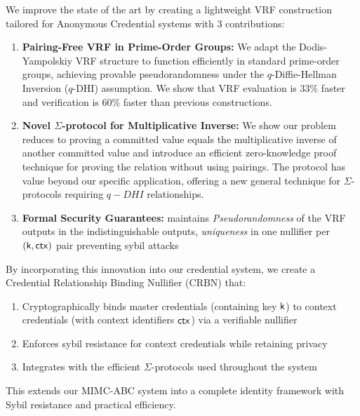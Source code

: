 \noindent We improve the state of the art by creating a lightweight VRF construction tailored for Anonymous Credential systems with 3 contributions:
\begin{enumerate}
        \item \textbf{Pairing-Free VRF in Prime-Order Groups:} We adapt the Dodis-Yampolskiy VRF structure to function efficiently in standard prime-order groups, achieving provable pseudorandomness under the $q$-Diffie-Hellman Inversion ($q$-DHI) assumption. We show that VRF evaluation is 33\% faster and verification is 60\% faster than previous constructions.

        \item \textbf{Novel $\Sigma$-protocol for Multiplicative Inverse:} We show our problem reduces to proving a committed value equals the multiplicative inverse of another committed value and introduce an efficient zero-knowledge proof technique for proving the relation without using pairings. The protocol has value beyond our specific application, offering a new general technique for $\Sigma$-protocols requiring $q-DHI$ relationships.

         \item \textbf{Formal Security Guarantees:} maintains \emph{Pseudorandomness} of the VRF outputs in the indistinguishable outputs, \emph{uniqueness} in one nullifier per $(\mathsf{k}, \mathsf{ctx})$ pair preventing sybil attacks

\end{enumerate}

By incorporating this innovation into our credential system, we create a Credential Relationship Binding Nullifier (CRBN) that:

\begin{enumerate}
    \item Cryptographically binds master credentials (containing key $\mathsf{k}$) to context credentials (with context identifiers $\mathsf{ctx}$) via a verifiable nullifier

    \item Enforces sybil resistance for context credentials while retaining privacy

    \item Integrates with the efficient $\Sigma$-protocols used throughout the system
    
\end{enumerate}

This extends our MIMC-ABC system into a complete identity framework with Sybil resistance and practical efficiency. 














